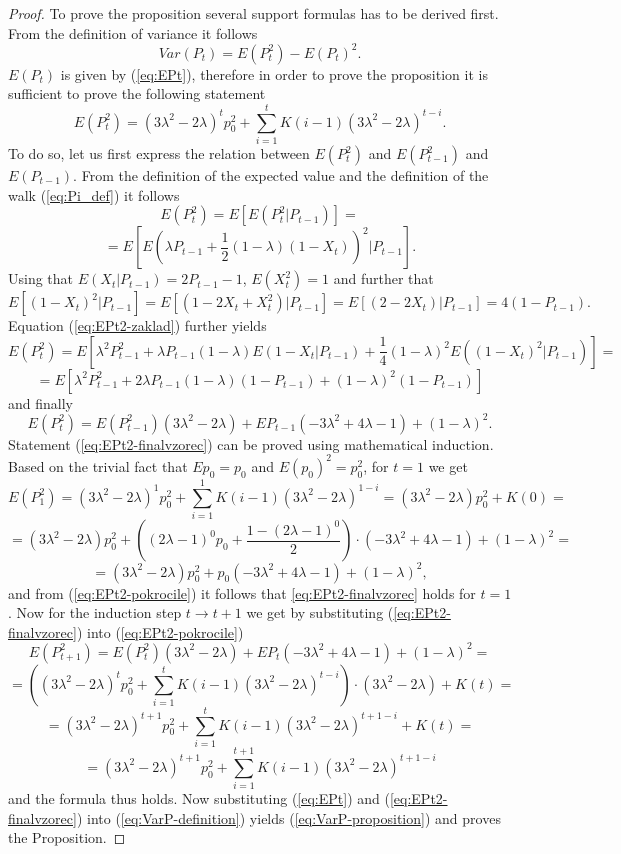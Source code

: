 \documentclass{amsart}
\theoremstyle{definition}
\theoremstyle{plain}
\theoremstyle{plain}
\numberwithin{equation}{section}
\begin{document}
\begin{proof}
To prove the proposition several support formulas has to be derived
first. From the definition of variance it follows 
\begin{equation}
Var(P_{t})=E(P_{t}^{2})-E(P_{t})^{2}.\label{eq:VarP-definition}
\end{equation}
$E(P_{t})$ is given by (\ref{eq:EPt}), therefore in order to prove
the proposition it is sufficient to prove the following statement
\begin{equation}
E(P_{t}^{2})=(3\lambda^{2}-2\lambda)^{t}p_{0}^{2}+\sum_{i=1}^{t}K(i-1)(3\lambda^{2}-2\lambda)^{t-i}.\label{eq:EPt2-finalvzorec}
\end{equation}
To do so, let us first express the relation between $E(P_{t}^{2})$
and $E(P_{t-1}^{2})$ and $E(P_{t-1}).$ From the definition of the
expected value and the definition of the walk (\ref{eq:Pi_def}) it follows
\[
E(P_{t}^{2})=E[E(P_{t}^{2}|P_{t-1})]=
\]
\begin{equation}
=E[E(\lambda P_{t-1}+\frac{1}{2}(1-\lambda)(1-X_{t}))^{2}|P_{t-1}].\label{eq:EPt2-zaklad}
\end{equation}
Using that $E(X_{t}|P_{t-1})=2P_{t-1}-1$, $E(X_{t}^{2})=1$ and further
that 
\[
E[(1-X_{t})^{2}|P_{t-1}]=E[(1-2X_{t}+X_{t}^{2})|P_{t-1}]
=E[(2-2X_{t})|P_{t-1}]= 4(1-P_{t-1}).
\]
Equation (\ref{eq:EPt2-zaklad}) further yields
\[
E(P_{t}^{2})=E[\lambda^{2}P_{t-1}^{2}+\lambda P_{t-1}(1-\lambda)E(1-X_{t}|P_{t-1})+\frac{1}{4}(1-\lambda)^{2}E((1-X_{t})^{2}|P_{t-1})]=
\]
\[
=E[\lambda^{2}P_{t-1}^{2}+2\lambda P_{t-1}(1-\lambda)(1-P_{t-1})+(1-\lambda)^{2}(1-P_{t-1})]
\]
 and finally
\begin{equation}
E(P_{t}^{2})=E(P_{t-1}^{2})(3\lambda^{2}-2\lambda)+EP_{t-1}(-3\lambda^{2}+4\lambda-1)+(1-\lambda)^{2}.\label{eq:EPt2-pokrocile}
\end{equation}
Statement (\ref{eq:EPt2-finalvzorec}) can be proved using mathematical induction.
Based on the trivial fact that $Ep_{0}=p_{0}$ and $E(p_{0})^{2}=p_{0}^{2}$,
for $t=1$ we get
\[
E(P_{1}^{2})=(3\lambda^{2}-2\lambda)^{1}p_{0}^{2}+\sum_{i=1}^{1}K(i-1)(3\lambda^{2}-2\lambda)^{1-i}=(3\lambda^{2}-2\lambda)p_{0}^{2}+K(0)=
\]
\[
=(3\lambda^{2}-2\lambda)p_{0}^{2}+((2\lambda-1)^{0}p_{0}+\frac{1-(2\lambda-1)^{0}}{2})\cdot(-3\lambda^{2}+4\lambda-1)+(1-\lambda)^{2}=
\]
\[
=(3\lambda^{2}-2\lambda)p_{0}^{2}+p_{0}(-3\lambda^{2}+4\lambda-1)+(1-\lambda)^{2},
\]
and from (\ref{eq:EPt2-pokrocile}) it follows that \eqref{eq:EPt2-finalvzorec} 
holds for $t=1$. Now for the induction step $t\rightarrow t+1$ we get by substituting
(\ref{eq:EPt2-finalvzorec}) into (\ref{eq:EPt2-pokrocile})
\[
E(P_{t+1}^{2})=E(P_{t}^{2})(3\lambda^{2}-2\lambda)+EP_{t}(-3\lambda^{2}+4\lambda-1)+(1-\lambda)^{2}=
\]
\[
=((3\lambda^{2}-2\lambda)^{t}p_{0}^{2}+\sum_{i=1}^{t}K(i-1)(3\lambda^{2}-2\lambda)^{t-i})\cdot(3\lambda^{2}-2\lambda)+K(t)=
\]
\[
=(3\lambda^{2}-2\lambda)^{t+1}p_{0}^{2}+\sum_{i=1}^{t}K(i-1)(3\lambda^{2}-2\lambda)^{t+1-i}+K(t)=
\]
\[
=(3\lambda^{2}-2\lambda)^{t+1}p_{0}^{2}+\sum_{i=1}^{t+1}K(i-1)(3\lambda^{2}-2\lambda)^{t+1-i}
\]
and the formula thus holds. Now substituting (\ref{eq:EPt}) and (\ref{eq:EPt2-finalvzorec})
into (\ref{eq:VarP-definition}) yields (\ref{eq:VarP-proposition})
and proves the Proposition.
\end{proof}
\end{document}
